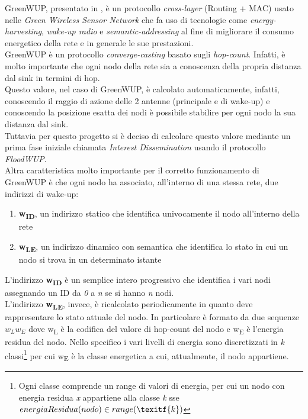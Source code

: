 GreenWUP, presentato in \cite{greenWup}, è un protocollo \textit{cross-layer} (Routing + MAC) usato nelle \textit{Green Wireless Sensor Network} che fa uso di tecnologie come \textit{energy-harvesting}, \textit{wake-up radio} e \textit{semantic-addressing} al fine di migliorare il consumo energetico della rete e in generale le sue prestazioni.  \\

GreenWUP è un protocollo \textit{converge-casting} basato sugli \textit{hop-count}. Infatti, è molto importante che ogni nodo della rete sia a conoscenza della propria distanza dal sink in termini di hop.\\
Questo valore, nel caso di GreenWUP, è calcolato automaticamente, infatti, conoscendo il raggio di azione delle 2 antenne (principale e di wake-up) e conoscendo la posizione esatta dei nodi è possibile stabilire per ogni nodo la sua distanza dal sink.\\

Tuttavia per questo progetto si è deciso di calcolare questo valore mediante un prima fase iniziale chiamata \textit{Interest Dissemination} usando il protocollo \textit{FloodWUP}.\\

Altra caratteristica molto importante per il corretto funzionamento di GreenWUP è che ogni nodo ha associato, all'interno di una stessa rete, due indirizzi di wake-up:
\begin{enumerate}
    \item \textbf{w\textsubscript{ID}}, un indirizzo statico che identifica univocamente il nodo all'interno della rete 
    \item \textbf{w\textsubscript{LE}}, un indirizzo dinamico con semantica che identifica lo stato in cui un nodo si trova in un determinato istante
\end{enumerate}
L'indirizzo \textbf{w\textsubscript{ID}} è un semplice intero progressivo che identifica i vari nodi assegnando un ID da \textit{0} a \textit{n} se si hanno \textit{n} nodi.\\
L'indirizzo \textbf{w\textsubscript{LE}}, invece, è ricalcolato periodicamente in quanto deve rappresentare lo stato attuale del nodo. In particolare è formato da due sequenze \(w_{L}w_{E}\) dove w\textsubscript{L} è la codifica del valore di hop-count del nodo e w\textsubscript{E} è l'energia residua del nodo. Nello specifico i vari livelli di energia sono discretizzati in \textit{k} classi\footnote{Ogni classe comprende un range di valori di energia, per cui un nodo con energia residua \textit{x} appartiene alla classe \textit{k} sse \(energiaResidua(nodo)\in range(\texitf{k})\)} per cui w\textsubscript{E} è la classe energetica a cui, attualmente, il nodo appartiene.\\

